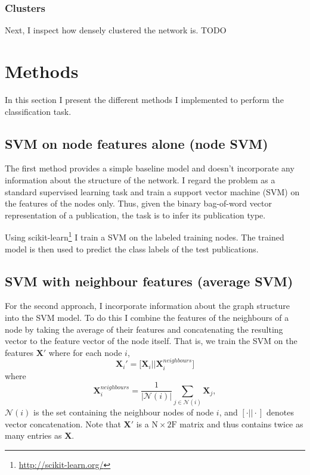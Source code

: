 \documentclass[12pt]{article}
\theoremstyle{definition}
\begin{document}
\subsubsection{Clusters}
Next, I inspect how densely clustered the network is. TODO

\section{Methods}
In this section I present the different methods I implemented to perform the classification task.

\subsection{SVM on node features alone (node SVM)}
The first method provides a simple baseline model and doesn't incorporate any information about the structure of the network. I regard the problem as a standard supervised learning task and train a support vector machine (SVM) on the features of the nodes only. Thus, given the binary bag-of-word vector representation of a publication, the task is to infer its publication type. 

\bigskip

Using scikit-learn\footnote{\url{http://scikit-learn.org/}} \cite{scikit-learn} I train a SVM on the labeled training nodes. The trained model is then used to predict the class labels of the test publications.

\subsection{SVM with neighbour features (average SVM)}
\label{section/average_svm}
For the second approach, I incorporate information about the graph structure into the SVM model. To do this I combine the features of the neighbours of a node by taking the average of their features and concatenating the resulting  vector to the feature vector of the node itself. That is, we train the SVM on the features $\mathbf{X}'$ where for each node $i$,
\[
	\mathbf{X}_i' = \big[\mathbf{X}_i \big\vert \big\vert \mathbf{X}^{\mathit{neighbours}}_i \big]
\]
where
\[
	\mathbf{X}^{\mathit{neighbours}}_i  = \frac{1}{\left\vert \mathcal{N}(i) \right\vert} \sum_{j \in \mathcal{N}(i)} \mathbf{X}_j,
\]
$\mathcal{N}(i)$ is the set containing the neighbour nodes of node $i$, and $[\cdot \vert\vert \cdot ]$ denotes vector concatenation. Note that $\mathbf{X}'$ is a $\textrm{N} \times 2 \textrm{F}$ matrix and thus contains twice as many entries as $\mathbf{X}$.
\end{document}
